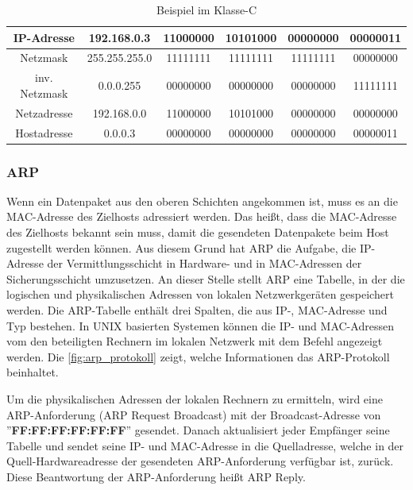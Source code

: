 \begin{table}[htbp]
	\centering
	\begin{tabular}{|c|c|c|c|c|c|}\hline
	   IP-Adresse 	& 192.168.0.3 	& 11000000 & 10101000 & 00000000 & 00000011 \\ \hline
	   Netzmask 	& 255.255.255.0 & 11111111 & 11111111 & 11111111 & 00000000 \\ \hline
	   inv. Netzmask 	& 0.0.0.255 & 00000000 & 00000000 & 00000000 & 11111111 \\ \hline
	   Netzadresse 	& 192.168.0.0 	& 11000000 & 10101000 & 00000000 & 00000000 \\ \hline
	   Hostadresse 	& 0.0.0.3		& 00000000 & 00000000 & 00000000 & 00000011 \\ \hline
	 \end{tabular}
	 \caption{Beispiel im Klasse-C}\label{klasse-c}
\end{table}

\subsubsection{ARP}

Wenn ein Datenpaket aus den oberen Schichten angekommen ist, muss es an die MAC-Adresse des Zielhosts adressiert werden. Das heißt, dass die MAC-Adresse des Zielhosts bekannt sein muss, damit die gesendeten Datenpakete beim Host zugestellt werden können. Aus diesem Grund hat ARP die Aufgabe, die IP-Adresse der Vermittlungsschicht in Hardware- und in MAC-Adressen der Sicherungsschicht umzusetzen. An dieser Stelle stellt ARP eine Tabelle, in der die logischen und physikalischen Adressen von lokalen Netzwerkgeräten gespeichert werden. Die ARP-Tabelle enthält drei Spalten, die aus IP-, MAC-Adresse und Typ bestehen. In UNIX basierten Systemen können die IP- und MAC-Adressen vom den beteiligten Rechnern im lokalen Netzwerk mit dem Befehl  angezeigt werden. Die \autoref{fig:arp_protokoll} zeigt, welche Informationen das ARP-Protokoll beinhaltet. \smallskip \smallskip

Um die physikalischen Adressen der lokalen Rechnern zu ermitteln, wird eine ARP-Anforderung (ARP Request Broadcast) mit der Broadcast-Adresse von ''\textbf{FF:FF:FF:FF:FF:FF}'' gesendet. Danach aktualisiert jeder Empfänger seine Tabelle und sendet seine IP- und MAC-Adresse in die Quelladresse, welche in der Quell-Hardwareadresse der gesendeten ARP-Anforderung verfügbar ist, zurück. Diese Beantwortung der ARP-Anforderung heißt ARP Reply. \smallskip \smallskip

